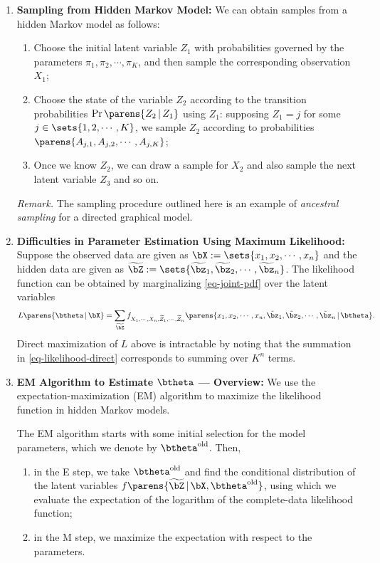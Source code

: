 \documentclass[12pt]{article}
\begin{document}
\begin{enumerate}[label=\textbf{\arabic*.}]
	\item \textbf{Sampling from Hidden Markov Model:} We can obtain samples from a hidden Markov model as follows: 
	\begin{enumerate}
		\item Choose the initial latent variable $Z_1$ with probabilities governed by the parameters $\pi_1, \pi_2, \cdots, \pi_K$, and then sample the corresponding observation $X_1$; 
		\item Choose the state of the variable $Z_2$ according to the transition probabilities $\Pr \parens{Z_2 \,\vert\, Z_1}$ using $Z_1$: supposing $Z_1 = j$ for some $j \in \sets{1, 2, \cdots, K}$, we sample $Z_2$ according to probabilities $\parens{A_{j,1}, A_{j,2}, \cdots, A_{j,K}}$; 
		\item Once we know $Z_2$, we can draw a sample for $X_2$ and also sample the next latent variable $Z_3$ and so on. 
	\end{enumerate}
	
	\textit{Remark.} The sampling procedure outlined here is an example of \emph{ancestral sampling} for a directed graphical model. 
	
	\item \textbf{Difficulties in Parameter Estimation Using Maximum Likelihood:} Suppose the observed data are given as $\bX := \sets{x_1, x_2, \cdots, x_n}$ and the hidden data are given as $\widetilde{\bZ} := \sets{\widetilde{\bz}_1, \widetilde{\bz}_2, \cdots, \widetilde{\bz}_n}$. The likelihood function can be obtained by marginalizing \eqref{eq-joint-pdf} over the latent variables 
	\begin{align}\label{eq-likelihood-direct}
		L \parens{\btheta \,\vert\, \bX} = \sum_{\widetilde{\bZ}} f_{X_1, \cdots, X_n, \widetilde{Z}_1, \cdots, \widetilde{Z}_n} \parens{x_1, x_2, \cdots, x_n, \tilde{\bz}_1, \tilde{\bz}_2, \cdots, \tilde{\bz}_n \,\vert\, \btheta}. 
	\end{align}
	Direct maximization of $L$ above is intractable by noting that the summation in \eqref{eq-likelihood-direct} corresponds to summing over $K^n$ terms. 
	
	\item \textbf{EM Algorithm to Estimate $\btheta$ --- Overview:} We use the expectation-maximization (EM) algorithm to maximize the likelihood function in hidden Markov models. 
	
	The EM algorithm starts with some initial selection for the model parameters, which we denote by $\btheta^{\mathrm{old}}$. Then, 
	\begin{enumerate}
		\item in the E step, we take $\btheta^{\mathrm{old}}$ and find the conditional distribution of the latent variables $f \parens{\widetilde{\bZ} \,\vert\, \bX, \btheta^{\mathrm{old}}}$, using which we evaluate the expectation of the logarithm of the complete-data likelihood function; 
		\item in the M step, we maximize the expectation with respect to the parameters. 
	\end{enumerate}
	

\end{enumerate}
\end{document}
